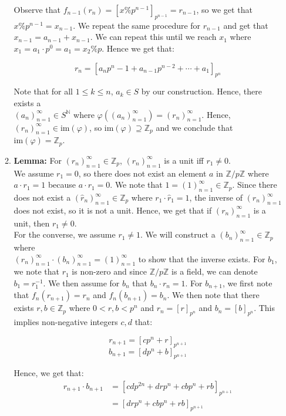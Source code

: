 \documentclass{article}
\begin{document}
\begin{enumerate}
\begin{enumerate}
    Observe that $f_{n-1}(r_{n}) = [x \% p^{n-1}]_{p^{n-1}} = r_{n-1}$, so we get that $x \% p^{n-1} = x_{n-1}$. We repeat the same procedure for $r_{n-1}$ and get that $x_{n-1} = a_{n-1} + x_{n-1}$. We can repeat this until we reach $x_1$ where $x_1 = a_1 \cdot p^0 = a_1 = x_2 \% p$. Hence we get that: 
    
    $$r_n = [a_np^n-1 + a_{n-1}p^{n-2}+ \cdots + a_1]_{p^{n}}$$

    Note that for all $1 \leq k \leq n$, $a_k \in S$ by our construction. Hence, there exists a \\
    $(a_n)^{\infty}_{n=1} \in S^{\mathbb{N}}$ where $\varphi((a_n)^{\infty}_{n=1}) = (r_n)^{\infty}_{n=1}$. Hence, $(r_n)^{\infty}_{n=1} \in \text{im}(\varphi)$, so $\text{im}(\varphi) \supseteq \mathbb{Z}_p$ and we conclude that $\text{im}(\varphi) = \mathbb{Z}_p$.\\

    \item 
    \textbf{Lemma:} For $(r_n)^{\infty}_{n=1} \in \mathbb{Z}_p$, $(r_n)^{\infty}_{n=1}$ is a unit iff $r_1 \neq 0$.\\

    We assume $r_1 = 0$, so there does not exist an element $a$ in $\mathbb{Z}/p\mathbb{Z}$ where $a \cdot r_1 = 1$ because $a \cdot r_1 = 0$. We note that $1 = (1)^{\infty}_{n=1}\in \mathbb{Z}_p$. Since there does not exist a $(\hat{r}_n)^{\infty}_{n=1} \in \mathbb{Z}_p$ where $r_1 \cdot \hat{r}_1 = 1$, the inverse of $(r_n)^{\infty}_{n=1}$ does not exist, so it is not a unit. Hence, we get that if $(r_n)^{\infty}_{n=1}$ is a unit, then $r_1 \neq 0$. \\

    For the converse, we assume $r_1 \neq 1$. We will construct a $(b_n)^{\infty}_{n=1} \in \mathbb{Z}_p$ where \\ $(r_n)^{\infty}_{n=1} \cdot (b_n)^{\infty}_{n=1} = (1)^{\infty}_{n=1}$ to show that the inverse exists. For $b_1$, we note that $r_1$ is non-zero and since $\mathbb{Z}/p\mathbb{Z}$ is a field, we can denote $b_1 = r_1^{-1}$.  We then assume for $b_n$ that $b_n \cdot r_n = 1$. For $b_{n+1}$, we first note that $f_n(r_{n+1}) = r_n$ and $f_n(b_{n+1}) = b_n$. We then note that there exists $r, b \in \mathbb{Z}_p$ where $0 < r, b < p^n$ and $r_n = [r]_{p^n}$ and $b_n = [b]_{p^n}$. This implies non-negative integers $c, d$ that: 

    $$r_{n+1} = [cp^n + r]_{p^{n+1}}$$
    $$b_{n+1} = [dp^n + b]_{p^{n+1}}$$

    Hence, we get that:  
    \begin{align*}
        r_{n+1} \cdot b_{n+1} &= [cdp^{2n} + drp^n + cbp^n + rb]_{p^{n+1}} \\
        &=  [drp^n + cbp^n + rb]_{p^{n+1}} 
    \end{align*}


\end{enumerate}
\end{enumerate}
\end{document}
